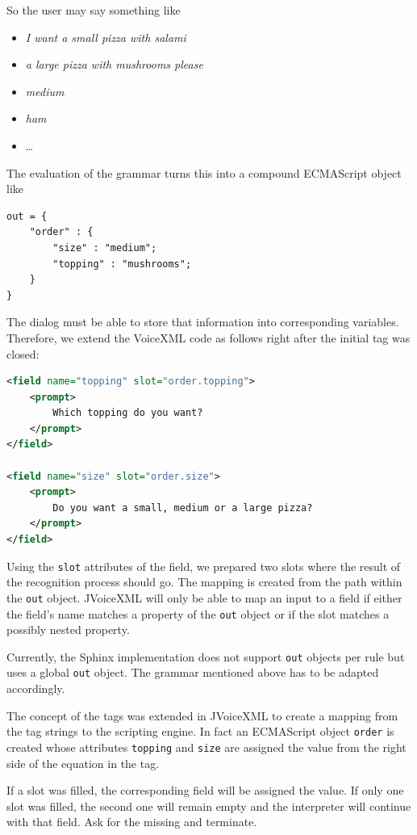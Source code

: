 \documentclass[11pt,a4paper]{book}
\begin{document}
So the user may say something like
\begin{itemize}
  \item \emph{I want a small pizza with salami}
  \item \emph{a large pizza with mushrooms please}
  \item \emph{medium}
  \item \emph{ham}
  \item \ldots
\end{itemize}

The evaluation of the grammar turns this into a compound ECMAScript object like
\begin{lstlisting}
out = {
    "order" : {
        "size" : "medium";
        "topping" : "mushrooms";
    }
}
\end{lstlisting}  

The dialog must be able to store that information into corresponding variables.
Therefore, we extend the VoiceXML code as follows right after the initial tag
was closed:
\begin{lstlisting}[language=XML]
<field name="topping" slot="order.topping">
    <prompt>
        Which topping do you want?
    </prompt>
</field>

<field name="size" slot="order.size">
    <prompt>
        Do you want a small, medium or a large pizza?
    </prompt>
</field>
\end{lstlisting}

Using the \lstinline{slot} attributes of the field, we prepared two slots where
the result of the recognition process should go. The mapping is created from 
the path within the \lstinline{out} object. JVoiceXML will only be able to
map an input to a field if either the field's name matches a property of the
\lstinline{out} object or if the slot matches a possibly nested property. 

Currently, the Sphinx implementation does not support \lstinline{out} objects
per rule but uses a global \lstinline{out} object. The grammar mentioned above
has to be adapted accordingly.

The concept of the tags was extended in JVoiceXML to create a mapping from the
tag strings to the scripting engine. In fact an ECMAScript object
\lstinline{order} is created whose attributes \lstinline{topping} and
\lstinline{size} are assigned the value from the right side of the equation in
the tag. 

If a slot was filled, the corresponding field will be assigned the value. If
only one slot was filled, the second one will remain empty and the interpreter
will continue with that field. Ask for the missing and terminate. 
\end{document}
